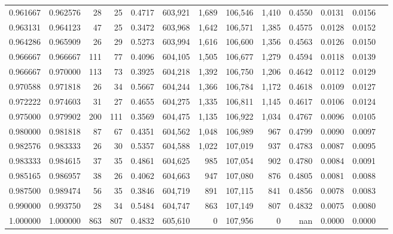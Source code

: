 \begin{tabular}{rrrrrrrrrrrrr}
0.961667 & 0.962576 &     28 &    25 &                                     0.4717 & 603,921 &   1,689 & 106,546 &   1,410 & 0.4550 & 0.0131 & 0.0156 \\
0.963131 & 0.964123 &     47 &    25 &                                     0.3472 & 603,968 &   1,642 & 106,571 &   1,385 & 0.4575 & 0.0128 & 0.0152 \\
0.964286 & 0.965909 &     26 &    29 &                                     0.5273 & 603,994 &   1,616 & 106,600 &   1,356 & 0.4563 & 0.0126 & 0.0150 \\
0.966667 & 0.966667 &    111 &    77 &                                     0.4096 & 604,105 &   1,505 & 106,677 &   1,279 & 0.4594 & 0.0118 & 0.0139 \\
0.966667 & 0.970000 &    113 &    73 &                                     0.3925 & 604,218 &   1,392 & 106,750 &   1,206 & 0.4642 & 0.0112 & 0.0129 \\
0.970588 & 0.971818 &     26 &    34 &                                     0.5667 & 604,244 &   1,366 & 106,784 &   1,172 & 0.4618 & 0.0109 & 0.0127 \\
0.972222 & 0.974603 &     31 &    27 &                                     0.4655 & 604,275 &   1,335 & 106,811 &   1,145 & 0.4617 & 0.0106 & 0.0124 \\
0.975000 & 0.979902 &    200 &   111 &                                     0.3569 & 604,475 &   1,135 & 106,922 &   1,034 & 0.4767 & 0.0096 & 0.0105 \\
0.980000 & 0.981818 &     87 &    67 &                                     0.4351 & 604,562 &   1,048 & 106,989 &     967 & 0.4799 & 0.0090 & 0.0097 \\
0.982576 & 0.983333 &     26 &    30 &                                     0.5357 & 604,588 &   1,022 & 107,019 &     937 & 0.4783 & 0.0087 & 0.0095 \\
0.983333 & 0.984615 &     37 &    35 &                                     0.4861 & 604,625 &     985 & 107,054 &     902 & 0.4780 & 0.0084 & 0.0091 \\
0.985165 & 0.986957 &     38 &    26 &                                     0.4062 & 604,663 &     947 & 107,080 &     876 & 0.4805 & 0.0081 & 0.0088 \\
0.987500 & 0.989474 &     56 &    35 &                                     0.3846 & 604,719 &     891 & 107,115 &     841 & 0.4856 & 0.0078 & 0.0083 \\
0.990000 & 0.993750 &     28 &    34 &                                     0.5484 & 604,747 &     863 & 107,149 &     807 & 0.4832 & 0.0075 & 0.0080 \\
1.000000 & 1.000000 &    863 &   807 &                                     0.4832 & 605,610 &       0 & 107,956 &       0 &    nan & 0.0000 & 0.0000 \\
\bottomrule
\end{tabular}
